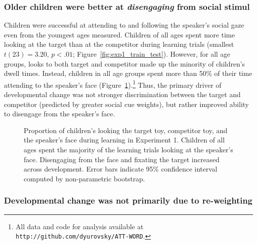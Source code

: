 \documentclass[man,floatsintext]{apa6}
\begin{document}
\subsubsection{Older children were better at \emph{disengaging} from social stimul} 

Children were successful at attending to and following the speaker's social gaze even from the youngest ages measured. Children of all ages spent more time looking at the target than at the competitor during learning trials (smallest $t(23)  = 3.20$, $p < .01$; Figure~\ref{fig:exp1_train_test}). However, for all age groups, looks to both target and competitor made up the minority of children's dwell times. Instead, children in all age groups spent more than 50\% of their time attending to the speaker's face (Figure~\ref{fig:exp1_train}).\footnote{All data and code for analysis available at \small{\tt{http://github.com/dyurovsky/ATT-WORD}}.} Thus, the primary driver of developmental change was not stronger discrimination between the target and competitor (predicted by greater social cue weights), but rather improved ability to disengage from the speaker's face. 

 \begin{figure}[tb]
	\caption{\label{fig:exp1_train} Proportion of children's looking the target toy, competitor toy, and the speaker's face during learning in Experiment 1. Children of all ages spent the majority of the learning trials looking at the speaker's face. Disengaging from the face and fixating the target increased across development. Error bars indicate 95\% confidence interval computed by non-parametric bootstrap.}
\end{figure}

\vspace{9 pt}

\subsubsection{Developmental change was not primarily due to re-weighting} 
\end{document}
